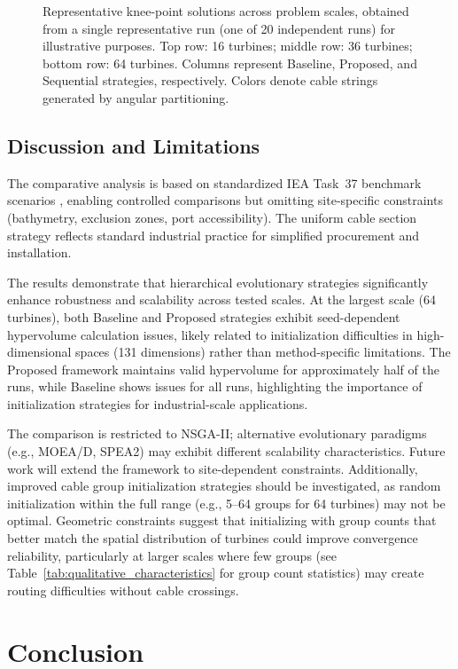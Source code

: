 \documentclass[format=sigconf,anonymous=true,review=true]{acmart}
\begin{document}
\begin{figure}[!t]
\caption{Representative knee-point solutions across problem scales, obtained from a single representative run (one of 20 independent runs) for illustrative purposes. Top row: 16 turbines; middle row: 36 turbines; bottom row: 64 turbines. Columns represent Baseline, Proposed, and Sequential strategies, respectively. Colors denote cable strings generated by angular partitioning.}
\label{fig:layout_examples}
\end{figure}

\subsection{Discussion and Limitations}

The comparative analysis is based on standardized IEA Task~37 benchmark scenarios \cite{Baker2019Best}, enabling controlled comparisons but omitting site-specific constraints (bathymetry, exclusion zones, port accessibility). The uniform cable section strategy reflects standard industrial practice for simplified procurement and installation.

The results demonstrate that hierarchical evolutionary strategies significantly enhance robustness and scalability across tested scales. At the largest scale (64 turbines), both Baseline and Proposed strategies exhibit seed-dependent hypervolume calculation issues, likely related to initialization difficulties in high-dimensional spaces (131 dimensions) rather than method-specific limitations. The Proposed framework maintains valid hypervolume for approximately half of the runs, while Baseline shows issues for all runs, highlighting the importance of initialization strategies for industrial-scale applications.

The comparison is restricted to NSGA-II; alternative evolutionary paradigms (e.g., MOEA/D, SPEA2) may exhibit different scalability characteristics. Future work will extend the framework to site-dependent constraints. Additionally, improved cable group initialization strategies should be investigated, as random initialization within the full range (e.g., 5--64 groups for 64 turbines) may not be optimal. Geometric constraints suggest that initializing with group counts that better match the spatial distribution of turbines could improve convergence reliability, particularly at larger scales where few groups (see Table~\ref{tab:qualitative_characteristics} for group count statistics) may create routing difficulties without cable crossings.

%
\section{Conclusion}
\end{document}
